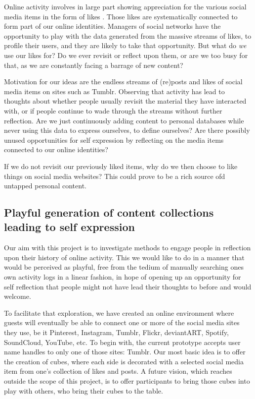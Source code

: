 \documentclass[]{article}
\begin{document}
Online activity involves in large part showing appreciation for the various social media items in the form of likes \cite{LM11}.  Those likes are systematically connected to form part of our online identities.  Managers of social networks have the opportunity to play with the data generated from the massive streams of likes, to profile their users, and they are likely to take that opportunity.
But what do \textit{we} use our likes for?  Do we ever revisit or reflect upon them,  or are we too busy for that, as we are constantly facing a barrage of new content?


Motivation for our ideas are the endless streams of (re)posts and likes of social media items on sites such as Tumblr\cite{1MinuteData,LM11}.  Observing that activity has lead to thoughts about whether people usually revisit the material they have interacted with, or if people continue to wade through the streams without further reflection.   Are we just continuously adding content to personal databases while never using this data to express ourselves, to define ourselves?  Are there possibly unused opportunities for self expression by reflecting on the media items connected to our online identities? 

If we do not revisit our previously liked items, why do we then choose to like things on social media websites?  This could prove to be a rich source ofd untapped personal content.


\subsection{Playful generation of content collections leading to self expression}

Our aim with this project is to investigate methods to engage people in reflection upon their history of online activity.  This we would like to do in a manner that would be perceived as playful, free from the tedium of manually searching ones own activity logs in a linear fashion, in hope of opening up an opportunity for self reflection that people might not have lead their thoughts to before and would welcome.

To facilitate that exploration, we have created an online environment where guests will eventually be able to connect one or more of the social media sites they use, be it Pinterest, Instagram, Tumblr, Flickr, deviantART, Spotify, SoundCloud, YouTube, etc.  To begin with, the current prototype accepts user name handles to only one of those sites:  Tumblr.  Our most basic idea is to offer the creation of cubes, where each side is decorated with a selected social media item from one's collection of likes and posts.  A future vision, which reaches outside the scope of this project, is to offer participants to bring those cubes into play with others, who bring their cubes to the table.
\end{document}
